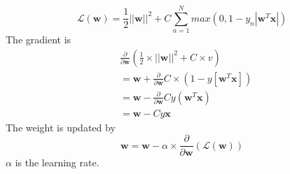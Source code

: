 \begin{equation}
\mathcal{L}(\mathbf{w})= \frac{1}{2}||\mathbf{w}||^2+C\sum_{n=1}^{N} max(0, 1-y_n|\mathbf{w}^T\mathbf{x}|)
\end{equation}
The gradient is 
\begin{align*}
& \frac{\partial}{\partial \mathbf{w}}(\frac{1}{2}\times||\mathbf{w}||^2+C\times v)\\
&=\mathbf{w}+\frac{\partial}{\partial \mathbf{w}}C\times (1-y[\mathbf{w}^T\mathbf{x}]) \\
&=\mathbf{w}-\frac{\partial}{\partial \mathbf{w}}Cy(\mathbf{w}^T\mathbf{x}) \\
&=\mathbf{w}-Cy\mathbf{x}
\end{align*}
The weight is updated by
\begin{equation}
  \mathbf{w}=\mathbf{w}-\alpha \times \frac{\partial}{\partial \mathbf{w}}(\mathcal{L}(\mathbf{w}))
\end{equation}
$\alpha$ is the learning rate.